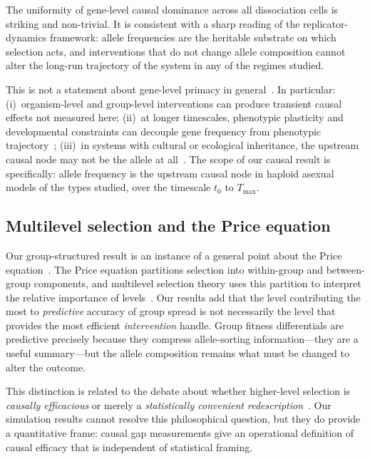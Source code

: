 \documentclass[11pt,a4paper]{article}
\newcommand{\Tfin}{T_{\max}}
\newcommand{\lev}[1]{\textit{#1}}
\begin{document}
The uniformity of gene-level causal dominance across all \NcellsDiss{} dissociation
cells is striking and non-trivial.
It is consistent with a sharp reading of the replicator-dynamics framework:
allele frequencies are the heritable substrate on which selection acts,
and interventions that do not change allele composition cannot alter
the long-run trajectory of the system in any of the regimes studied.

This is not a statement about gene-level primacy in general~\citep{Gould1979,
Pigliucci2001, Laland2011}.
In particular:
(i)~organism-level and group-level interventions can produce transient
causal effects not measured here;
(ii)~at longer timescales, phenotypic plasticity and developmental
constraints can decouple gene frequency from phenotypic trajectory~\citep{West-Eberhard2003,
Hansen2006, Pigliucci2001};
(iii)~in systems with cultural or ecological inheritance, the upstream
causal node may not be the allele at all~\citep{Odling-Smee2003, Laland2011}.
The scope of our causal result is specifically: allele frequency is the
upstream causal node in haploid asexual models of the types studied,
over the timescale $t_0$ to $\Tfin$.

\subsection{Multilevel selection and the Price equation}

Our group-structured result is an instance of a general point about the
Price equation~\citep{Price1970, Hamilton1975, Frank1995}.
The Price equation partitions selection into within-group and between-group
components, and multilevel selection theory uses this partition to interpret
the relative importance of levels~\citep{Okasha2006, Kerr2002, Traulsen2006}.
Our results add that the level contributing the most to
\emph{predictive} accuracy of group spread is not necessarily the level that
provides the most efficient \emph{intervention} handle.
Group fitness differentials are predictive precisely because they compress
allele-sorting information---they are a useful summary---but the allele
composition remains what must be changed to alter the outcome.

This distinction is related to the debate about whether higher-level selection
is \lev{causally efficacious} or merely a \lev{statistically convenient
redescription}~\citep{Sober1994, Okasha2006, West2007, Gardner2011}.
Our simulation results cannot resolve this philosophical question, but they
do provide a quantitative frame: causal gap measurements give an operational
definition of causal efficacy that is independent of statistical framing.
\end{document}

